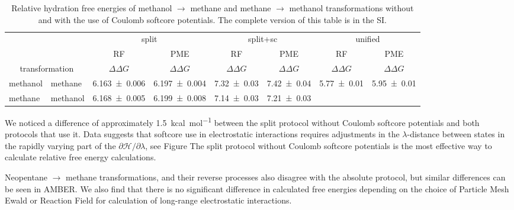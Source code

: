 \documentclass[journal=jctcce,manuscript=article]{achemso}
\begin{document}
\begin{table}[]
\centering
\caption{Relative hydration free energies of methanol $\rightarrow$ methane and methane $\rightarrow$
methanol transformations without and with the use of Coulomb softcore potentials. The complete version 
of this table is in the SI.}
\label{tab:eff-sc}
\begin{tabular}{@{}llclclcl@{}}
\toprule
 &  & \multicolumn{2}{c}{split} & \multicolumn{2}{c}{split+sc} & \multicolumn{2}{c}{unified} \\
 &  & RF & \multicolumn{1}{c}{PME} & RF & \multicolumn{1}{c}{PME} & RF & \multicolumn{1}{c}{PME} \\
\multicolumn{2}{c}{transformation} & $\Delta \Delta G$ & \multicolumn{1}{c}{$\Delta \Delta G$} & $\Delta \Delta G$ & \multicolumn{1}{c}{$\Delta \Delta G$} & $\Delta \Delta G$ & \multicolumn{1}{c}{$\Delta \Delta G$} \\ \midrule
methanol & methane & \multicolumn{1}{l}{\num{6.163 +- 0.006}} & \num{6.197 +- 0.004} & \multicolumn{1}{l}{\num{7.32+-0.03}} & \num{7.42+-0.04} & \multicolumn{1}{l}{\num{5.77 +- 0.01}} & \num{5.95 +- 0.01} \\
methane & methanol & \multicolumn{1}{l}{\num{6.168 +- 0.005}} & \num{6.199 +- 0.008} & \multicolumn{1}{l}{\num{7.14+-0.03}} & \num{7.21+-0.03} & \multicolumn{1}{l}{} &  \\ \bottomrule
\end{tabular}
\end{table}

We noticed a difference of approximately \SI{1.5}{kcal.mol^{-1}} between the split protocol without 
Coulomb softcore potentials and both protocols that use it. Data suggests that softcore use in 
electrostatic interactions requires adjustments in the $\lambda$-distance between states in the
rapidly varying part of the $\partial \mathcal{H}/\partial\lambda$, see Figure
The split protocol without Coulomb softcore potentials is the most effective way to calculate 
relative free energy calculations. 

Neopentane $\rightarrow$ methane transformations, and their reverse processes 
also disagree with the absolute protocol, but similar differences can be seen in AMBER.
We also find that there is no significant difference in calculated free energies depending on the choice of 
Particle Mesh Ewald or Reaction Field for calculation of long-range electrostatic interactions. 
\end{document}
